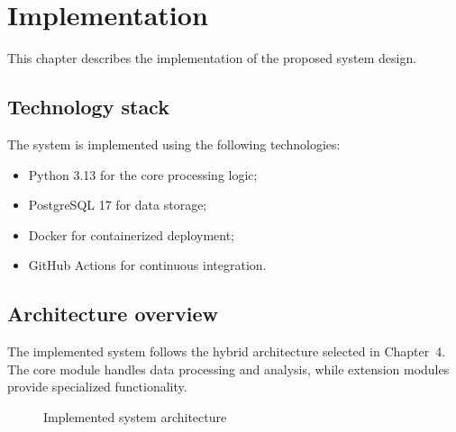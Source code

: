 \section{Implementation}

This chapter describes the implementation of the proposed system design.

\subsection{Technology stack}

The system is implemented using the following technologies:
\begin{itemize}
    \item Python 3.13 for the core processing logic;
    \item PostgreSQL 17 for data storage;
    \item Docker for containerized deployment;
    \item GitHub Actions for continuous integration.
\end{itemize}

\subsection{Architecture overview}

The implemented system follows the hybrid architecture selected in Chapter~4.
The core module handles data processing and analysis, while extension modules provide specialized functionality.

\begin{figure}[H]
    \centering
    \caption{Implemented system architecture} \label{fig:impl-arch}
\end{figure}

